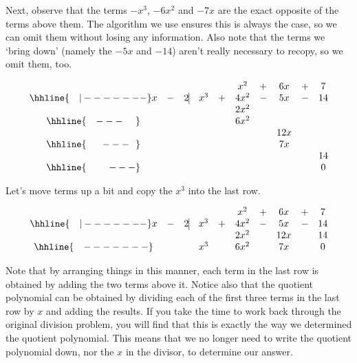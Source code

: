 \documentclass{ximera}
\begin{document}
\setlength\arraycolsep{5pt}
\setlength\extrarowheight{0pt}


Next, observe that the terms $-x^3$, $-6x^2$ and $-7x$ are the exact opposite of the terms above them.  The algorithm we use ensures this is always the case, so we can omit them without losing any information. Also note that the terms we `bring down' (namely the $-5x$ and $-14$) aren't really necessary to recopy, so we omit them, too.

\setlength\arraycolsep{0.1pt}
\setlength\extrarowheight{2pt}

\[ 
\begin{array}{cccccccccc}
    & & & & & x^2 & + & 6x & + & 7 \\ \hhline{~~~|-------}
    x & - & 2  \vline&   x^3 & + & 4x^2 & - & 5x & - & 14 \\
    &  &  &   &  &   2x^2 &  &  &  &  \\ \hhline{~~~---~~~~} 
    &  &  &   &  & 6 x^2 &  &  &  &  \\ 
    &  &  &   & &  &  &  12x &  &  \\ \hhline{~~~~~---~~} 
    &  &  &   &   &  & & 7x  &  &  \\
    &  &  &   &   &  & &   &  &  14  \\ \hhline{~~~~~~~---} 
    &   &  &  &  &  &  &  &  & 0
\end{array}
\]

\setlength\arraycolsep{5pt}
\setlength\extrarowheight{0pt}

Let's move terms up a bit and copy the $x^3$ into the last row.

\setlength\arraycolsep{0.1pt}
\setlength\extrarowheight{2pt}

\[ 
\begin{array}{cccccccccc}
    
    & & & & & x^2 & + & 6x & + & 7 \\ \hhline{~~~|-------}
    
    x & - & 2  \vline&   x^3 & + & 4x^2 & - & 5x & - & 14 \\
    
    &  &  &   & &   2x^2 &  & 12x &  & 14 \\ \hhline{~~~-------} 
    &  &  & x^3  &  & 6 x^2 &  & 7x &  &0  \\  
\end{array}
\]

\setlength\arraycolsep{5pt}
\setlength\extrarowheight{0pt}

Note that by arranging things in this manner, each term in the last row is obtained by adding the two terms above it.  Notice also that the quotient polynomial can be obtained by dividing each of the first three terms in the last row by $x$ and adding the results.   If you take the time to work back through the original division problem, you will find that this is exactly the way we determined the quotient polynomial.  This means that we no longer need to write the quotient polynomial down, nor the $x$ in the divisor, to determine our answer.
\end{document}
